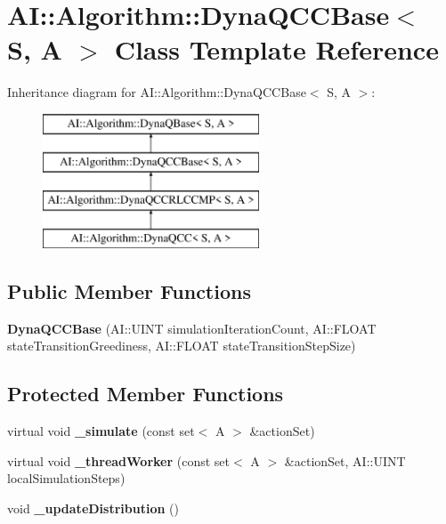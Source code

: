 \hypertarget{classAI_1_1Algorithm_1_1DynaQCCBase}{\section{A\-I\-:\-:Algorithm\-:\-:Dyna\-Q\-C\-C\-Base$<$ S, A $>$ Class Template Reference}
\label{classAI_1_1Algorithm_1_1DynaQCCBase}
}
Inheritance diagram for A\-I\-:\-:Algorithm\-:\-:Dyna\-Q\-C\-C\-Base$<$ S, A $>$\-:\begin{figure}[H]
\begin{center}
\leavevmode
\includegraphics[height=4.000000cm]{classAI_1_1Algorithm_1_1DynaQCCBase}
\end{center}
\end{figure}
\subsection*{Public Member Functions}
\begin{DoxyCompactItemize}
\item 
\hypertarget{classAI_1_1Algorithm_1_1DynaQCCBase_acd1924d5f560d9a7298e442dfa33716a}{{\bfseries Dyna\-Q\-C\-C\-Base} (A\-I\-::\-U\-I\-N\-T simulation\-Iteration\-Count, A\-I\-::\-F\-L\-O\-A\-T state\-Transition\-Greediness, A\-I\-::\-F\-L\-O\-A\-T state\-Transition\-Step\-Size)}\label{classAI_1_1Algorithm_1_1DynaQCCBase_acd1924d5f560d9a7298e442dfa33716a}

\end{DoxyCompactItemize}
\subsection*{Protected Member Functions}
\begin{DoxyCompactItemize}
\item 
\hypertarget{classAI_1_1Algorithm_1_1DynaQCCBase_adc1bb07bb9025dc0c2963ded741b43a2}{virtual void {\bfseries \-\_\-simulate} (const set$<$ A $>$ \&action\-Set)}\label{classAI_1_1Algorithm_1_1DynaQCCBase_adc1bb07bb9025dc0c2963ded741b43a2}

\item 
\hypertarget{classAI_1_1Algorithm_1_1DynaQCCBase_a56e5d7ee46d67400f9e2411e801f93d2}{virtual void {\bfseries \-\_\-thread\-Worker} (const set$<$ A $>$ \&action\-Set, A\-I\-::\-U\-I\-N\-T local\-Simulation\-Steps)}\label{classAI_1_1Algorithm_1_1DynaQCCBase_a56e5d7ee46d67400f9e2411e801f93d2}

\item 
\hypertarget{classAI_1_1Algorithm_1_1DynaQCCBase_aeff65821d73179f84390892d8a2b0d3c}{void {\bfseries \-\_\-update\-Distribution} ()}\label{classAI_1_1Algorithm_1_1DynaQCCBase_aeff65821d73179f84390892d8a2b0d3c}

\end{DoxyCompactItemize}

